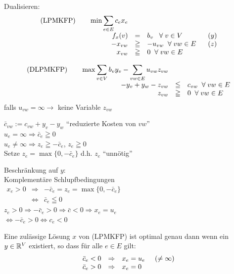 Dualisieren:
\[\begin{array}{rcl@{\hspace{6mm}}l}
(\mbox{LPMKFP}) \hspace{7mm} \min \displaystyle \sum_{e \in E} c_{e}
x_{e}\\
f_{x}(v) & = & b_{v} \; \; \; \forall \; v \in V& (y)\\
- x_{v w} &\geqq& - u_{v w} \; \; \forall \; v w \in E& (z)\\
x_{v w} &\geqq& 0 \; \; \forall \; v w \in E
\end{array}\]

\[\begin{array}{rcl}
(\mbox{DLPMKFP}) \hspace{7mm} \max \displaystyle \sum_{v\in V} b_{v}y_{v} -
\sum_{v w \in E} u_{v w} z_{v w}\\
- y_{v} + y_{w} - z_{v w} &\leqq& c_{v w} \; \; \forall \; v w \in E\\
z_{v w} &\geqq& 0 \; \; \forall \; v w \in E
\end{array}\]
falls $u_{v w} = \infty \rightarrow$ keine Variable $z_{v w}$

$\bar{c}_{v w} := c_{v w} + y_{v} - y_{w}$ "`reduzierte Kosten von $v w$"'\\
$u_{e} = \infty \Rightarrow \bar{c}_{e} \geqq 0$\\
$u_{e} \neq \infty \Rightarrow z_{e} \geqq - \bar{c}_{e}$, $z_{e} \geqq 0$\\
Setze $z_{e} = \max\{0, -\bar{c}_{e}\}$ d.h. $z_{e}$ "`unnötig"'

Beschränkung auf $y$:\\
Komplementäre Schlupfbedingungen\\
$\begin{array}{rcl} x_{e} > 0 &\Rightarrow& -\bar{c}_{e} = z_{e} = \max\{0,
- \bar{c}_{e}\}\\
&\Leftrightarrow& \bar{c}_{e} \leqq 0\end{array}$\\
$z_{e} > 0 \Rightarrow -\bar{c}_e>0 \Rightarrow \bar{c}<0 \Rightarrow 
x_{e} = u_{e}$\\
$\Leftrightarrow -\bar{c}_{e} > 0 \Leftrightarrow c_{e} < 0$

\begin{satz} \label{ZulLLPMKFP}
Eine zulässige Lösung $x$ von (LPMKFP) ist optimal genau dann wenn ein $y
\in \mathbb{R}^{V}$ existiert, so dass für alle $e \in E$ gilt:
\[\begin{array}{rcl}
\bar{c}_{e} < 0 &\Rightarrow& x_{e} = u_{e} \hspace{5mm} (\neq \infty)\\
\bar{c}_{e} > 0 &\Rightarrow& x_{e} = 0
\end{array}\]
\end{satz}

